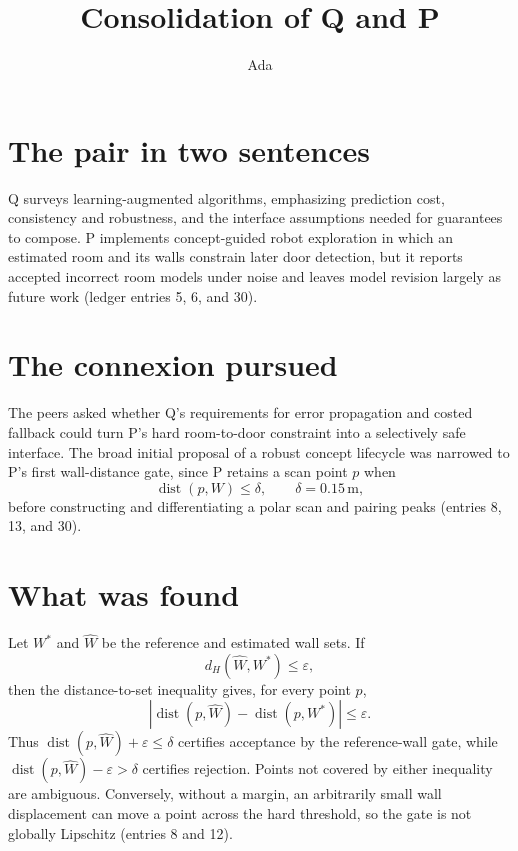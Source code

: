 \documentclass{article}
\title{Consolidation of Q and P}
\author{Ada}
\date{}
\begin{document}
\maketitle

\section*{The pair in two sentences}
Q surveys learning-augmented algorithms, emphasizing prediction cost, consistency and robustness, and the interface assumptions needed for guarantees to compose. P implements concept-guided robot exploration in which an estimated room and its walls constrain later door detection, but it reports accepted incorrect room models under noise and leaves model revision largely as future work (ledger entries 5, 6, and 30).

\section*{The connexion pursued}
The peers asked whether Q's requirements for error propagation and costed fallback could turn P's hard room-to-door constraint into a selectively safe interface. The broad initial proposal of a robust concept lifecycle was narrowed to P's first wall-distance gate, since P retains a scan point $p$ when
\[
  \operatorname{dist}(p,W)\leq \delta, \qquad \delta=0.15\,\mathrm{m},
\]
before constructing and differentiating a polar scan and pairing peaks (entries 8, 13, and 30).

\section*{What was found}
Let $W^*$ and $\widehat W$ be the reference and estimated wall sets. If
\[
  d_H(\widehat W,W^*)\leq \varepsilon,
\]
then the distance-to-set inequality gives, for every point $p$,
\[
  \left|\operatorname{dist}(p,\widehat W)
  -\operatorname{dist}(p,W^*)\right|\leq \varepsilon.
\]
Thus $\operatorname{dist}(p,\widehat W)+\varepsilon\leq\delta$ certifies acceptance by the reference-wall gate, while
$\operatorname{dist}(p,\widehat W)-\varepsilon>\delta$ certifies rejection. Points not covered by either inequality are ambiguous. Conversely, without a margin, an arbitrarily small wall displacement can move a point across the hard threshold, so the gate is not globally Lipschitz (entries 8 and 12).
\end{document}
